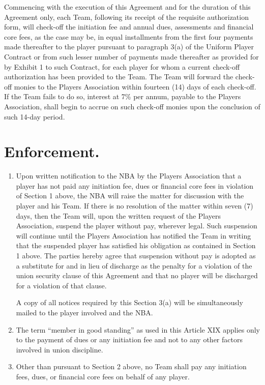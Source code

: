 \documentclass[
]{book}
\begin{document}
Commencing with the execution of this Agreement and for the duration of this Agreement only, each Team, following its receipt of the requisite authorization form, will check-off the initiation fee and annual dues, assessments and financial core fees, as the case may be, in equal installments from the first four payments made thereafter to the player pursuant to paragraph 3(a) of the Uniform Player Contract or from such lesser number of payments made thereafter as provided for by Exhibit 1 to such Contract, for each player for whom a current check-off authorization has been provided to the Team. The Team will forward the check-off monies to the Players Association within fourteen (14) days of each check-off. If the Team fails to do so, interest at 7\% per annum, payable to the Players Association, shall begin to accrue on such check-off monies upon the conclusion of such 14-day period.

\hypertarget{enforcement.}{%
\section{Enforcement.}\label{enforcement.}}

\begin{enumerate}
\def\labelenumi{(\alph{enumi})}
\item
  Upon written notification to the NBA by the Players Association that a player has not paid any initiation fee, dues or financial core fees in violation of Section 1 above, the NBA will raise the matter for discussion with the player and his Team. If there is no resolution of the matter within seven (7) days, then the Team will, upon the written request of the Players Association, suspend the player without pay, wherever legal. Such suspension will continue until the Players Association has notified the Team in writing that the suspended player has satisfied his obligation as contained in Section 1 above. The parties hereby agree that suspension without pay is adopted as a substitute for and in lieu of discharge as the penalty for a violation of the union security clause of this Agreement and that no player will be discharged for a violation of that clause.

  A copy of all notices required by this Section 3(a) will be simultaneously mailed to the player involved and the NBA.
\item
  The term ``member in good standing'' as used in this Article XIX applies only to the payment of dues or any initiation fee and not to any other factors involved in union discipline.
\item
  Other than pursuant to Section 2 above, no Team shall pay any initiation fees, dues, or financial core fees on behalf of any player.
\end{enumerate}
\end{document}
